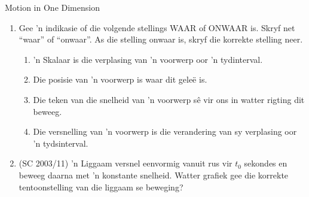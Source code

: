 \begin{eocexercises}{Motion in One Dimension}
\begin{enumerate}[noitemsep, label=\textbf{\arabic*}. ]
    \item Gee  'n indikasie of die volgende stellings WAAR of ONWAAR is. Skryf net ``waar'' of ``onwaar''. As die stelling onwaar is, skryf die korrekte stelling neer.
    \begin{enumerate}[noitemsep, label=\textbf{\alph*}. ] 
        \item  'n Skalaar is die verplasing van  'n voorwerp oor  'n tydinterval.
        \item Die posisie van  'n voorwerp is waar dit gele\"e is.
        \item Die teken van die snelheid van  'n voorwerp s\^e vir ons in watter rigting dit beweeg.
        \item Die versnelling van  'n voorwerp is die verandering van sy verplasing oor  'n tydsinterval.
    \end{enumerate}
    
    \item (SC 2003/11)  'n Liggaam versnel eenvormig vanuit rus vir $t_0$ sekondes en beweeg daarna met  'n konstante snelheid. Watter grafiek gee die korrekte tentoonstelling van die liggaam se beweging?


\end{enumerate}
\end{eocexercises}
